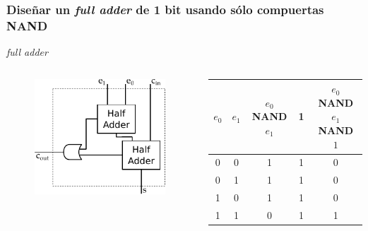 \documentclass[mathserif,hyperref={pdfpagelabels=false}]{beamer}
\begin{document}
\begin{frame}
\frametitle{\small Diseñar un \textit{full adder} de 1 bit usando sólo
compuertas NAND}
\textit{full adder}
\begin{columns}[T]
  \begin{figure}[htp]
    \includegraphics[scale=0.9]{fulladder.pdf}
  \end{figure}

  \small \begin{center}\begin{tabular}{| c | c || c | c || c |}
    \hline
    $e_0$ & $e_1$ & $e_0$ NAND $e_1$ & 1 &  $e_0$ NAND $e_1$ NAND $1$ \\
    \hline
      0   &   0   &         1        & 1 &               0            \\
      0   &   1   &         1        & 1 &               0            \\
      1   &   0   &         1        & 1 &               0            \\
      1   &   1   &         0        & 1 &               1            \\
    \hline
  \end{tabular}\end{center}
\end{columns}
\end{frame}
\end{document}
